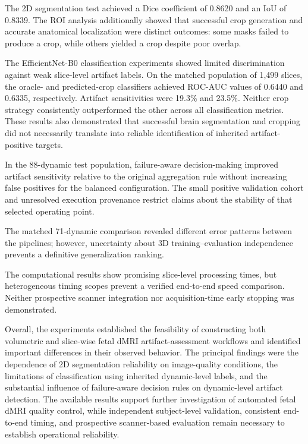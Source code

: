 The 2D segmentation test achieved a Dice coefficient of 0.8620 and an IoU of 0.8339. The ROI analysis additionally showed that successful crop generation and accurate anatomical localization were distinct outcomes: some masks failed to produce a crop, while others yielded a crop despite poor overlap.

The EfficientNet-B0 classification experiments showed limited discrimination against weak slice-level artifact labels. On the matched population of 1,499 slices, the oracle- and predicted-crop classifiers achieved ROC-AUC values of 0.6440 and 0.6335, respectively. Artifact sensitivities were 19.3\% and 23.5\%. Neither crop strategy consistently outperformed the other across all classification metrics. These results also demonstrated that successful brain segmentation and cropping did not necessarily translate into reliable identification of inherited artifact-positive targets.

In the 88-dynamic test population, failure-aware decision-making improved artifact sensitivity relative to the original aggregation rule without increasing false positives for the balanced configuration. The small positive validation cohort and unresolved execution provenance restrict claims about the stability of that selected operating point.

The matched 71-dynamic comparison revealed different error patterns between the pipelines; however, uncertainty about 3D training--evaluation independence prevents a definitive generalization ranking.

The computational results show promising slice-level processing times, but heterogeneous timing scopes prevent a verified end-to-end speed comparison. Neither prospective scanner integration nor acquisition-time early stopping was demonstrated.

Overall, the experiments established the feasibility of constructing both volumetric and slice-wise fetal dMRI artifact-assessment workflows and identified important differences in their observed behavior. The principal findings were the dependence of 2D segmentation reliability on image-quality conditions, the limitations of classification using inherited dynamic-level labels, and the substantial influence of failure-aware decision rules on dynamic-level artifact detection. The available results support further investigation of automated fetal dMRI quality control, while independent subject-level validation, consistent end-to-end timing, and prospective scanner-based evaluation remain necessary to establish operational reliability.
